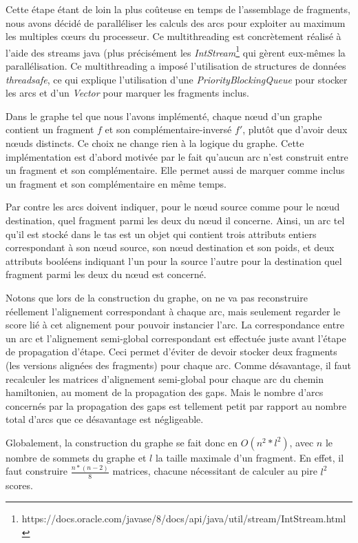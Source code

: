 \documentclass{article}
\begin{document}
Cette étape étant de loin la plus coûteuse en temps de l'assemblage de fragments, nous avons décidé de paralléliser les calculs des arcs pour exploiter au maximum les multiples cœurs du processeur. Ce multithreading est concrètement réalisé à l'aide des streams java (plus précisément les \textit{IntStream}\footnote{https://docs.oracle.com/javase/8/docs/api/java/util/stream/IntStream.html} qui gèrent eux-mêmes la parallélisation. Ce multithreading a imposé l'utilisation de structures de données \textit{threadsafe}, ce qui explique l'utilisation d'une \textit{PriorityBlockingQueue} pour stocker les arcs et d'un \textit{Vector} pour marquer les fragments inclus.

Dans le graphe tel que nous l'avons implémenté, chaque nœud d'un graphe contient un fragment $f$ et son complémentaire-inversé $f'$, plutôt que d'avoir deux nœuds distincts. Ce choix ne change rien à la logique du graphe. Cette implémentation est d'abord motivée par le fait qu'aucun arc n'est construit entre un fragment et son complémentaire. Elle permet aussi de marquer comme inclus un fragment et son complémentaire en même temps.

Par contre les arcs doivent indiquer, pour le nœud source comme pour le nœud destination, quel fragment parmi les deux du nœud il concerne. Ainsi, un arc tel qu'il est stocké dans le tas est un objet qui contient trois attributs entiers correspondant à son nœud source, son nœud destination et son poids, et deux attributs booléens indiquant l'un pour la source l'autre pour la destination quel fragment parmi les deux du nœud est concerné.

Notons que lors de la construction du graphe, on ne va pas reconstruire réellement l'alignement correspondant à chaque arc, mais seulement regarder le score lié à cet alignement pour pouvoir instancier l'arc. La correspondance entre un arc et l'alignement semi-global correspondant est effectuée juste avant l'étape de propagation d'étape. Ceci permet d'éviter de devoir stocker deux fragments (les versions alignées des fragments) pour chaque arc. 
Comme désavantage, il faut recalculer les matrices d'alignement semi-global pour chaque arc du chemin hamiltonien, au moment de la propagation des gaps. Mais le nombre d'arcs concernés par la propagation des gaps est tellement petit par rapport au nombre total d'arcs que ce désavantage est négligeable.

Globalement, la construction du graphe se fait donc en $O(n^2*l^2)$, avec $n$ le nombre de sommets du graphe et $l$ la taille maximale d'un fragment. En effet, il faut construire $\frac{n*(n-2)}{8}$ matrices, chacune nécessitant de calculer au pire $l^2$ scores.
\end{document}
